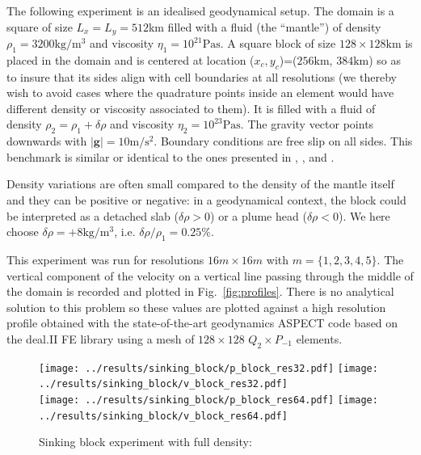 \documentclass[a4paper]{article}
\begin{document}
The following experiment is an idealised geodynamical setup.
The domain is a square of size $L_x=L_y=512$km filled with a fluid (the ``mantle'')
of density $\rho_1=3200\si{\kg\per\cubic\metre}$ 
and viscosity $\eta_1=10^{21}\si{\pascal\second}$.
A square block of size $128\times 128\si{\km}$ is placed in the domain and
is centered at location ($x_c,y_c$)=($256\si{\km}$, $384\si{\km}$) so 
as to insure that its sides
align with cell boundaries at all resolutions (we thereby wish to avoid
cases where the quadrature points inside an element would have different
density or viscosity associated to them). It is filled with a fluid
of density $\rho_2=\rho_1+\delta \rho$ and viscosity $\eta_2=10^{23}\si{\pascal\second}$.
The gravity vector points downwards with $|{\bm g}|=10\si{\metre\per\square\second}$. 
Boundary conditions are free slip on all sides.
This benchmark is similar or identical to the ones presented in 
\cite{mamo08}, \cite{gery10}, \cite{thie11} and \cite{sctc20}.

Density variations are often small compared to the density of the mantle itself
and they can be positive or negative: in a geodynamical context, 
the block could be interpreted as a detached slab
($\delta\rho>0$) or a plume head ($\delta\rho<0$). 
We here choose $\delta \rho=+8\si{\kg\per\cubic\metre}$, i.e. $\delta \rho/\rho_1 = 0.25\%$.

This experiment was run for resolutions $16m\times 16m$ with $m=\{1,2,3,4,5\}$. 
The vertical component of the velocity on a vertical line passing through the middle
of the domain is recorded and plotted in Fig.~\ref{fig:profiles}. 
There is no analytical solution to this problem so 
these values are plotted against a high resolution profile obtained with the state-of-the-art geodynamics ASPECT 
code\cite{krhb12,hedg17} based on the deal.II FE library \cite{XX} 
using a mesh of $128\times128$ $Q_2\times P_{-1}$ elements.





\begin{figure}
\centering
\texttt{[image: ../results/sinking\_block/p\_block\_res32.pdf]}
\texttt{[image: ../results/sinking\_block/v\_block\_res32.pdf]}\\
\texttt{[image: ../results/sinking\_block/p\_block\_res64.pdf]}
\texttt{[image: ../results/sinking\_block/v\_block\_res64.pdf]}
\caption{Sinking block experiment with full density: } \label{fig:resblock}
\end{figure}
\end{document}
